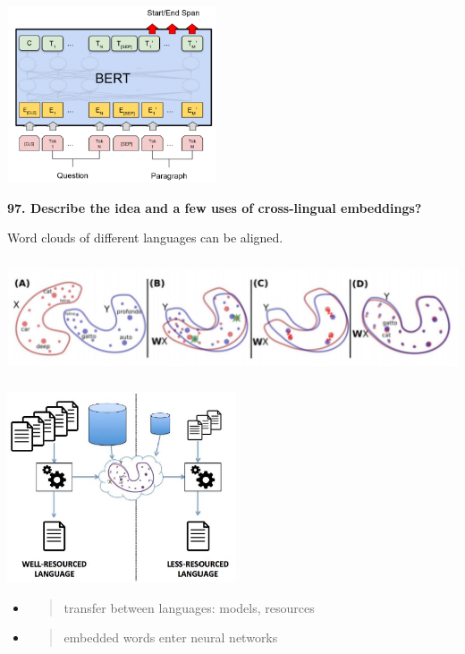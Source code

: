 \includegraphics[width=2.44427in,height=2.04325in]{media/image37.png}

\textbf{97. Describe the idea and a few uses of cross-lingual
embeddings?}

Word clouds of different languages can be aligned.

\includegraphics[width=6.26772in,height=1.34722in]{media/image22.png}

\includegraphics[width=2.66146in,height=2.2209in]{media/image27.png}

\begin{itemize}
\item
  \begin{quote}
  transfer between languages: models, resources
  \end{quote}
\end{itemize}

\begin{itemize}
\item
  \begin{quote}
  embedded words enter neural networks
  \end{quote}
\end{itemize}

